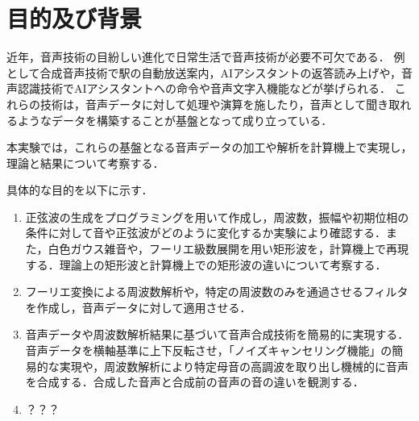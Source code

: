 \chapter{目的及び背景}
近年，音声技術の目紛しい進化で日常生活で音声技術が必要不可欠である．
例として合成音声技術で駅の自動放送案内，AIアシスタントの返答読み上げや，音声認識技術でAIアシスタントへの命令や音声文字入機能などが挙げられる．
これらの技術は，音声データに対して処理や演算を施したり，音声として聞き取れるようなデータを構築することが基盤となって成り立っている．\par
本実験では，これらの基盤となる音声データの加工や解析を計算機上で実現し，理論と結果について考察する．\par
具体的な目的を以下に示す．
\begin{enumerate}
	\item 正弦波の生成をプログラミングを用いて作成し，周波数，振幅や初期位相の条件に対して音や正弦波がどのように変化するか実験により確認する．また，白色ガウス雑音や，フーリエ級数展開を用い矩形波を，計算機上で再現する．理論上の矩形波と計算機上での矩形波の違いについて考察する．
	\item フーリエ変換による周波数解析や，特定の周波数のみを通過させるフィルタを作成し，音声データに対して適用させる．
	\item 音声データや周波数解析結果に基づいて音声合成技術を簡易的に実現する．音声データを横軸基準に上下反転させ，「ノイズキャンセリング機能」の簡易的な実現や，周波数解析により特定母音の高調波を取り出し機械的に音声を合成する．合成した音声と合成前の音声の音の違いを観測する．
	\item ？？？
\end{enumerate}


